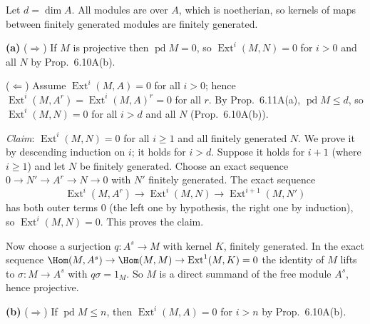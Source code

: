 \documentclass[11pt]{article}
\begin{document}
\pf
Let $d=\dim A$. All modules are over $A$, which is noetherian, so kernels of maps between finitely generated modules are finitely generated.

\textbf{(a)} ($\Rightarrow$) If $M$ is projective then $\operatorname{pd}M=0$, so $\operatorname{Ext}^i(M,N)=0$ for $i>0$ and all $N$ by Prop.~6.10A(b).

($\Leftarrow$) Assume $\operatorname{Ext}^i(M,A)=0$ for all $i>0$; hence $\operatorname{Ext}^i(M,A^r)=\operatorname{Ext}^i(M,A)^r=0$ for all $r$. By Prop.~6.11A(a), $\operatorname{pd}M\le d$, so $\operatorname{Ext}^i(M,N)=0$ for all $i>d$ and all $N$ (Prop.~6.10A(b)).

\emph{Claim}: $\operatorname{Ext}^i(M,N)=0$ for all $i\ge1$ and all finitely generated $N$. We prove it by descending induction on $i$; it holds for $i>d$. Suppose it holds for $i+1$ (where $i\ge1$) and let $N$ be finitely generated. Choose an exact sequence $0\to N'\to A^r\to N\to0$ with $N'$ finitely generated. The exact sequence
\[
\operatorname{Ext}^i(M,A^r)\to\operatorname{Ext}^i(M,N)\to\operatorname{Ext}^{i+1}(M,N')
\]
has both outer terms $0$ (the left one by hypothesis, the right one by induction), so $\operatorname{Ext}^i(M,N)=0$. This proves the claim.

Now choose a surjection $q\colon A^s\to M$ with kernel $K$, finitely generated. In the exact sequence $\Hom(M,A^s)\to\Hom(M,M)\to\operatorname{Ext}^1(M,K)=0$ the identity of $M$ lifts to $\sigma\colon M\to A^s$ with $q\sigma=1_M$. So $M$ is a direct summand of the free module $A^s$, hence projective.

\textbf{(b)} ($\Rightarrow$) If $\operatorname{pd}M\le n$, then $\operatorname{Ext}^i(M,A)=0$ for $i>n$ by Prop.~6.10A(b).
\end{document}
